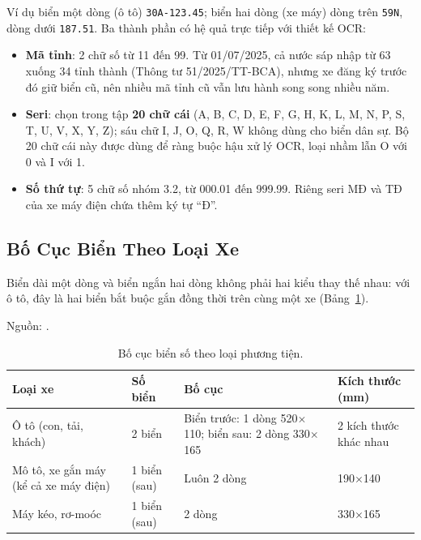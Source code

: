 \noindent Ví dụ biển một dòng (ô tô) \texttt{30A-123.45}; biển hai dòng (xe máy) dòng
trên \texttt{59N}, dòng dưới \texttt{187.51}. Ba thành phần có hệ quả trực tiếp với thiết
kế OCR:

\begin{itemize}
  \item \textbf{Mã tỉnh}: 2 chữ số từ 11 đến 99. Từ 01/07/2025, cả nước sáp nhập từ 63
        xuống 34 tỉnh thành (Thông tư 51/2025/TT-BCA), nhưng xe đăng ký trước đó giữ biển
        cũ, nên nhiều mã tỉnh cũ vẫn lưu hành song song nhiều năm.
  \item \textbf{Seri}: chọn trong tập \textbf{20 chữ cái} (A, B, C, D, E, F, G, H, K, L,
        M, N, P, S, T, U, V, X, Y, Z); sáu chữ I, J, O, Q, R, W không dùng cho biển dân
        sự. Bộ 20 chữ cái này được dùng để ràng buộc hậu xử lý OCR, loại nhầm lẫn O với 0
        và I với 1.
  \item \textbf{Số thứ tự}: 5 chữ số nhóm 3.2, từ 000.01 đến 999.99. Riêng seri MĐ và TĐ
        của xe máy điện chứa thêm ký tự ``Đ''.
\end{itemize}

\subsection{Bố Cục Biển Theo Loại Xe}

Biển dài một dòng và biển ngắn hai dòng không phải hai kiểu thay thế nhau: với ô tô, đây
là hai biển bắt buộc gắn đồng thời trên cùng một xe (Bảng~\ref{tab:bienso-bocuc}).

\begin{table}[htbp]
\centering
\caption{Bố cục biển số theo loại phương tiện.}

{\footnotesize Nguồn: \autocite{tt792024bca,tt812024bca}.}
\label{tab:bienso-bocuc}
\small
\begin{tabular}{p{3.2cm} p{1.6cm} p{3.0cm} p{3.0cm}}
\toprule
\textbf{Loại xe} & \textbf{Số biển} & \textbf{Bố cục} & \textbf{Kích thước (mm)} \\
\midrule
Ô tô (con, tải, khách) & 2 biển & Biển trước: 1 dòng 520$\times$110; biển sau: 2 dòng 330$\times$165 & 2 kích thước khác nhau \\
\addlinespace
Mô tô, xe gắn máy (kể cả xe máy điện) & 1 biển (sau) & Luôn 2 dòng & 190$\times$140 \\
\addlinespace
Máy kéo, rơ-moóc & 1 biển (sau) & 2 dòng & 330$\times$165 \\
\bottomrule
\end{tabular}
\end{table}


